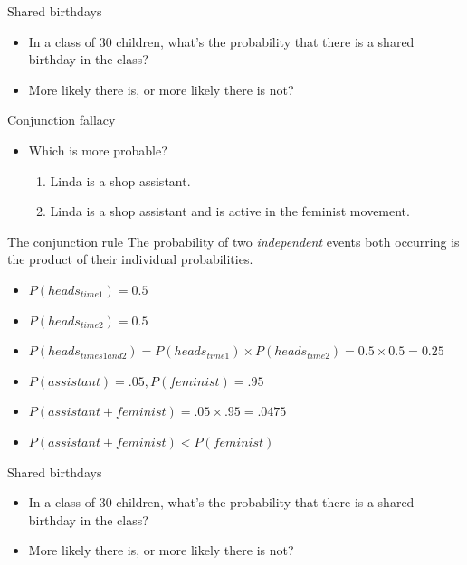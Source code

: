 \documentclass{beamer}
\begin{document}
\begin{frame}{Shared birthdays}
	\begin{itemize} 
        \item In a class of 30 children, what's the probability that there is a
          shared birthday in the class?
	\item More likely there is, or more likely there is not?
	\end{itemize}
\end{frame}

\begin{frame}{Conjunction fallacy}
\begin{itemize}
\item Which is more probable?
\begin{enumerate}
\item Linda is a shop assistant.
\item Linda is a shop assistant and is active in the feminist movement.
\end{enumerate} 
\end{itemize}
\end{frame}

\begin{frame}{The conjunction rule}
The probability of two \emph{independent} events both occurring is the product of their individual probabilities.
\begin{itemize}
\item $P(heads_{time 1}) = 0.5$
\item $P(heads_{time 2}) = 0.5$
\item $P(heads_{times 1 and 2}) = P(heads_{time 1}) \times P(heads_{time 2}) = 0.5 \times 0.5 = 0.25$
\item $P(assistant) = .05, P(feminist) = .95$
\item $P(assistant + feminist) = .05 \times .95 = .0475$
\item $P(assistant + feminist) < P(feminist)$
\end{itemize}
\end{frame}

\begin{frame}{Shared birthdays}
	\begin{itemize} 
        \item In a class of 30 children, what's the probability that there is a
          shared birthday in the class?
	\item More likely there is, or more likely there is not?
	\end{itemize}
\end{frame}
\end{document}
